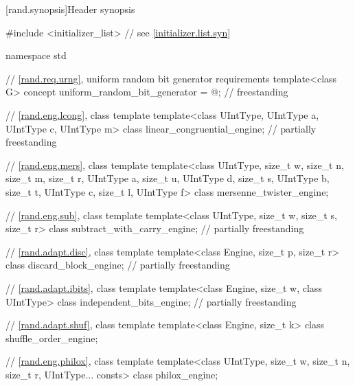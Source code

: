 

[rand.synopsis]{Header  synopsis}


\begin{codeblock}
#include <initializer_list>     // see \ref{initializer.list.syn}

namespace std {
  // \ref{rand.req.urng}, uniform random bit generator requirements
  template<class G>
    concept uniform_random_bit_generator = @\seebelow@;           // freestanding

  // \ref{rand.eng.lcong}, class template 
  template<class UIntType, UIntType a, UIntType c, UIntType m>
    class linear_congruential_engine;                           // partially freestanding

  // \ref{rand.eng.mers}, class template 
  template<class UIntType, size_t w, size_t n, size_t m, size_t r,
           UIntType a, size_t u, UIntType d, size_t s,
           UIntType b, size_t t,
           UIntType c, size_t l, UIntType f>
    class mersenne_twister_engine;

  // \ref{rand.eng.sub}, class template 
  template<class UIntType, size_t w, size_t s, size_t r>
    class subtract_with_carry_engine;                           // partially freestanding

  // \ref{rand.adapt.disc}, class template 
  template<class Engine, size_t p, size_t r>
    class discard_block_engine;                                 // partially freestanding

  // \ref{rand.adapt.ibits}, class template 
  template<class Engine, size_t w, class UIntType>
    class independent_bits_engine;                              // partially freestanding

  // \ref{rand.adapt.shuf}, class template 
  template<class Engine, size_t k>
    class shuffle_order_engine;

  // \ref{rand.eng.philox}, class template 
  template<class UIntType, size_t w, size_t n, size_t r, UIntType... consts>
    class philox_engine;

}
\end{codeblock}
